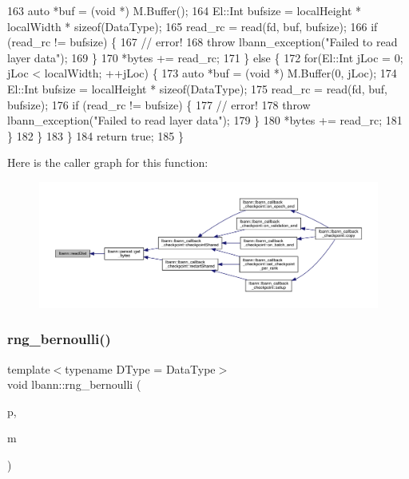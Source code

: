 \begin{DoxyCode}
163       \textcolor{keyword}{auto} *buf = (\textcolor{keywordtype}{void} *) M.Buffer();
164       El::Int bufsize = localHeight * localWidth * \textcolor{keyword}{sizeof}(DataType);
165       read\_rc = read(fd, buf, bufsize);
166       \textcolor{keywordflow}{if} (read\_rc != bufsize) \{
167         \textcolor{comment}{// error!}
168         \textcolor{keywordflow}{throw} lbann\_exception(\textcolor{stringliteral}{"Failed to read layer data"});
169       \}
170       *bytes += read\_rc;
171     \} \textcolor{keywordflow}{else} \{
172       \textcolor{keywordflow}{for}(El::Int jLoc = 0; jLoc < localWidth; ++jLoc) \{
173         \textcolor{keyword}{auto} *buf = (\textcolor{keywordtype}{void} *) M.Buffer(0, jLoc);
174         El::Int bufsize = localHeight * \textcolor{keyword}{sizeof}(DataType);
175         read\_rc = read(fd, buf, bufsize);
176         \textcolor{keywordflow}{if} (read\_rc != bufsize) \{
177           \textcolor{comment}{// error!}
178           \textcolor{keywordflow}{throw} lbann\_exception(\textcolor{stringliteral}{"Failed to read layer data"});
179         \}
180         *bytes += read\_rc;
181       \}
182     \}
183   \}
184   \textcolor{keywordflow}{return} \textcolor{keyword}{true};
185 \}
\end{DoxyCode}
Here is the caller graph for this function\+:\nopagebreak
\begin{figure}[H]
\begin{center}
\leavevmode
\includegraphics[width=350pt]{namespacelbann_ab2c2ad3c98b9991a6307b123617dbfb2_icgraph}
\end{center}
\end{figure}
\mbox{\label{namespacelbann_a481f0c268c74d3ec8b81861472559870}} 
\subsubsection{\texorpdfstring{rng\+\_\+bernoulli()}{rng\_bernoulli()}}
{\footnotesize\ttfamily template$<$typename D\+Type  = Data\+Type$>$ \\
void lbann\+::rng\+\_\+bernoulli (\begin{DoxyParamCaption}\item[{const float}]{p,  }\item[{\hyperlink{base_8hpp_a0fab5387556805cfeac3e7e567bf66c5}{Dist\+Mat} $\ast$}]{m }\end{DoxyParamCaption})}

